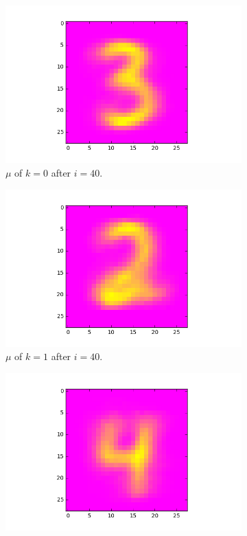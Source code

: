 \documentclass[a4paper,10pt]{article}
\numberwithin{equation}{section} %
\numberwithin{figure}{section} %
\numberwithin{table}{section} %
\theoremstyle{mytheor}
\begin{document}
\begin{enumerate}
\begin{figure}[h!]
\begin{subfigure}[b]{0.26\textwidth}
				\includegraphics[width=\textwidth]{digits/39_k3_class0.png}\vspace{-0.4cm}
				\caption{$\mu$ of $k=0$ after $i=40$.}
			\end{subfigure}
			\begin{subfigure}[b]{0.26\textwidth}
				\includegraphics[width=\textwidth]{digits/39_k3_class1.png}\vspace{-0.4cm}
				\caption{$\mu$ of $k=1$ after $i=40$.}
			\end{subfigure}
			\begin{subfigure}[b]{0.26\textwidth}
				\includegraphics[width=\textwidth]{digits/39_k3_class2.png}\vspace{-0.4cm}

\end{subfigure}
\end{figure}
\end{enumerate}
\end{document}
